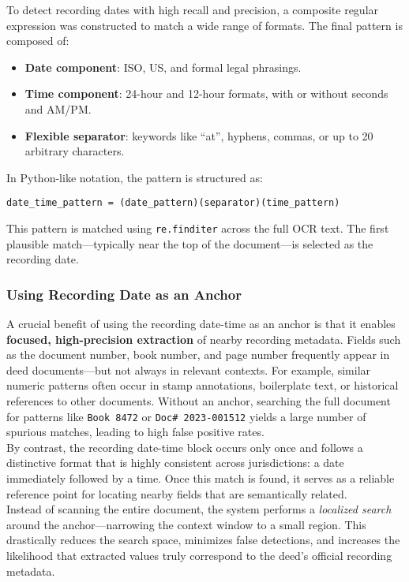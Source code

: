 \documentclass{article}
\begin{document}
To detect recording dates with high recall and precision, a composite regular expression was constructed to match a wide range of formats. The final pattern is composed of:

\begin{itemize}
    \item \textbf{Date component}: ISO, US, and formal legal phrasings.
    \item \textbf{Time component}: 24-hour and 12-hour formats, with or without seconds and AM/PM.
    \item \textbf{Flexible separator}: keywords like ``at'', hyphens, commas, or up to 20 arbitrary characters.
\end{itemize}

In Python-like notation, the pattern is structured as:

\texttt{date\_time\_pattern = (date\_pattern)(separator)(time\_pattern)}

This pattern is matched using \texttt{re.finditer} across the full OCR text. The first plausible match—typically near the top of the document—is selected as the recording date.

\subsubsection{Using Recording Date as an Anchor}

A crucial benefit of using the recording date-time as an anchor is that it enables \textbf{focused, high-precision extraction} of nearby recording metadata. Fields such as the document number, book number, and page number frequently appear in deed documents—but not always in relevant contexts. For example, similar numeric patterns often occur in stamp annotations, boilerplate text, or historical references to other documents. Without an anchor, searching the full document for patterns like \texttt{Book 8472} or \texttt{Doc\# 2023-001512} yields a large number of spurious matches, leading to high false positive rates. \\

By contrast, the recording date-time block occurs only once and follows a distinctive format that is highly consistent across jurisdictions: a date immediately followed by a time. Once this match is found, it serves as a reliable reference point for locating nearby fields that are semantically related. \\ 

Instead of scanning the entire document, the system performs a \textit{localized search} around the anchor—narrowing the context window to a small region. This drastically reduces the search space, minimizes false detections, and increases the likelihood that extracted values truly correspond to the deed's official recording metadata. \\
\end{document}
